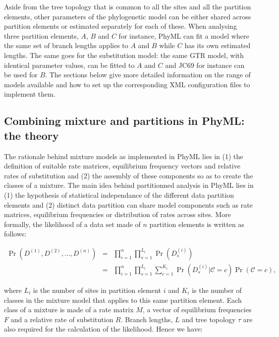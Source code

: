 \documentclass[a4paper,12pt]{article}
\begin{document}
Aside from the tree topology  that is common to all the sites and  all the partition elements, other
parameters of  the phylogenetic model  can be either shared  across partition elements  or estimated
separately  for each  of  these. When  analysing  three partition  elements, $A$,  $B$  and $C$  for
instance, PhyML can  fit a model where the same  set of branch lengths applies to  $A$ and $B$ while
$C$ has its  own estimated lengths.  The same  goes for the substitution model: the  same GTR model,
with identical parameter values, can be fitted to $A$  and $C$ and JC69 for instance can be used for
$B$. The sections below  give more detailed information on the range of  models available and how to
set up the corresponding XML configuration files to implement them.


\subsection{Combining mixture and partitions in PhyML: the  theory}

The rationale behind mixture  models as implemented in PhyML lies in (1)  the definition of suitable
rate matrices, equilibrium frequency vectors and relative rates of substitution and (2) the assembly
of these  components so as  to create the  classes of a mixture.  The main idea  behind partitionned
analysis in  PhyML lies  in (1)  the hypothesis of  statistical independance  of the  different data
partition elements and (2) distinct data partition can share model components such as rate matrices,
equilibrium frequencies or  distribution of rates across  sites. More formally, the  likelihood of a
data set made of $n$ partition elements is written as follows:

\begin{eqnarray*}
\Pr(D^{(1)},D^{(2)},\ldots,D^{(n)}) &=& \prod_{i=1}^{n}  \prod_{s=1}^{L_i} \Pr(D^{(i)}_s) \\
&=& \prod_{i=1}^{n}  \prod_{s=1}^{L_i} \sum_{c=1}^{K_i} \Pr(D^{(i)}_s|\mathcal{C}=c) \Pr(\mathcal{C}=c),
\end{eqnarray*} 

where $L_i$ is  the number of sites in partition  element $i$ and $K_i$ is the  number of classes in
the mixture model that applies to this same partition  element. Each class of a mixture is made of a
rate  matrix $M$,  a vector  of equilibrium  frequencies  $F$ and  a relative  rate of  substitution
$R$. Branch  lengths, $L$ and  tree topology $\tau$  are also required  for the calculation  of the
likelihood. Hence we have:
\end{document}
